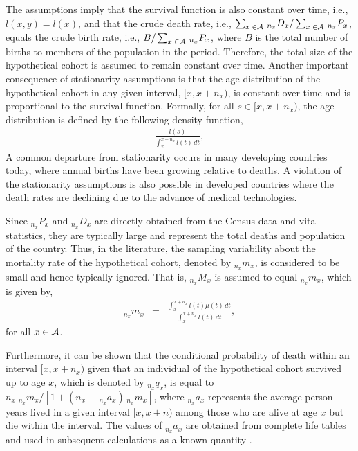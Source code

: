 \documentclass[11pt,letterpaper]{article}
\theoremstyle{plain}
\begin{document}
The assumptions imply that the survival function is also constant over
time, i.e., $l(x,y)=l(x)$, and that the crude death rate, i.e.,
$\sum_{x\; \in \mathcal{A}} \,_{n_x}D_x/\sum_{x\; \in \mathcal{A}}\,_{n_x}P_x$, equals
the crude birth rate, i.e., $B / \sum_{x\; \in \mathcal{A}}\,_{n_x}P_x$, where
$B$ is the total number of births to members of the population in the
period.  Therefore, the total size of the hypothetical cohort is
assumed to remain constant over time. Another important consequence of
stationarity assumptions is that the age distribution of the
hypothetical cohort in any given interval, $[x,x+n_x)$, is constant
over time and is proportional to the survival function. Formally, for
all $s \in [x, x+n_x)$, the age distribution is defined by the
following density function,
\begin{eqnarray}
   \frac{l(s)}{\int_x^{x+n_x} l(t)\, dt},  
\label{eq:age}
\end{eqnarray}
A common departure from stationarity occurs in many
developing countries today, where annual births have been growing
relative to deaths. A violation of the stationarity assumptions is
also possible in developed countries where the death rates are
declining due to the advance of medical technologies.

Since $_{n_x}P_x$ and $_{n_x}D_x$ are directly obtained from the
Census data and vital statistics, they are typically large and
represent the total deaths and population of the country.  Thus, in
the literature, the sampling variability about the mortality rate of
the hypothetical cohort, denoted by $_{n_x}m_x$, is considered to be
small and hence typically ignored. That is, $_{n_x}M_x$ is assumed to
equal $_{n_x}m_x$, which is given by,
\begin{eqnarray}
  _{n_x}m_x & = & \frac{\int_x^{x+n_x} l(t) \mu(t)\, dt}{\int_x^{x+n_x}
    l(t)\, dt}, \label{eq:nmx}
\end{eqnarray}
for all $x \in \mathcal{A}$.  

Furthermore, it can be shown that the conditional probability of death
within an interval $[x,x+n_x)$ given that an individual of the
hypothetical cohort survived up to age $x$, which is denoted by
$_{n_x}q_x$, is equal to
$n_x\;_{n_x}m_x/[1+(n_x-\,_{n_x}a_x)\,_{n_x}m_x]$, where $_{n_x}a_x$
represents the average person-years lived in a given interval $[x,
x+n)$ among those who are alive at age $x$ but die within the
interval.  The values of $_{n_x}a_x$ are obtained from complete life
tables and used in subsequent calculations as a known quantity
\cite{PreHeuGui00}.
\end{document}
